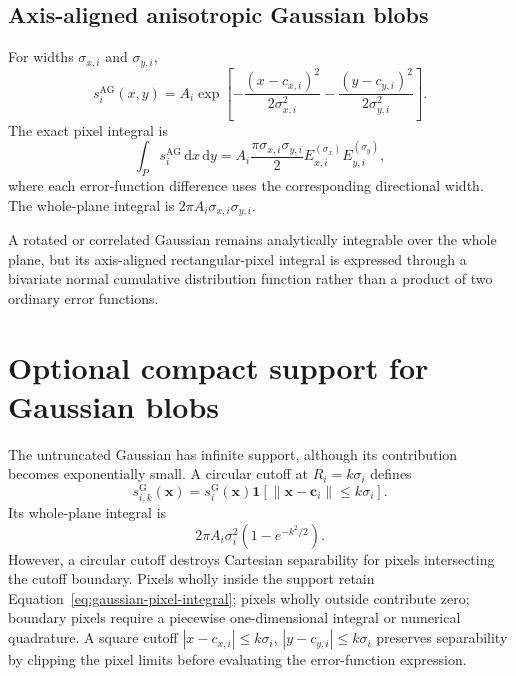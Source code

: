 \documentclass[11pt,a4paper]{article}
\newcommand{\ind}{\mathbf{1}}
\begin{document}
\subsection{Axis-aligned anisotropic Gaussian blobs}

For widths $\sigma_{x,i}$ and $\sigma_{y,i}$,
\begin{equation}
s_i^{\mathrm{AG}}(x,y)
=
A_i\exp\!\left[
-\frac{(x-c_{x,i})^2}{2\sigma_{x,i}^2}
-\frac{(y-c_{y,i})^2}{2\sigma_{y,i}^2}
\right].
\end{equation}
The exact pixel integral is
\begin{equation}
\int_P s_i^{\mathrm{AG}}\,\mathrm{d}x\,\mathrm{d}y
=
A_i\frac{\pi\sigma_{x,i}\sigma_{y,i}}{2}
E_{x,i}^{(\sigma_x)}E_{y,i}^{(\sigma_y)},
\end{equation}
where each error-function difference uses the corresponding directional width.
The whole-plane integral is $2\pi A_i\sigma_{x,i}\sigma_{y,i}$.

A rotated or correlated Gaussian remains analytically integrable over the whole
plane, but its axis-aligned rectangular-pixel integral is expressed through a
bivariate normal cumulative distribution function rather than a product of two
ordinary error functions.

\section{Optional compact support for Gaussian blobs}

The untruncated Gaussian has infinite support, although its contribution becomes
exponentially small. A circular cutoff at $R_i=k\sigma_i$ defines
\begin{equation}
s_{i,k}^{\mathrm{G}}(\bm{x})
=
s_i^{\mathrm{G}}(\bm{x})
\ind\!\left[\|\bm{x}-\bm{c}_i\|\le k\sigma_i\right].
\end{equation}
Its whole-plane integral is
\begin{equation}
2\pi A_i\sigma_i^2\left(1-e^{-k^2/2}\right).
\end{equation}
However, a circular cutoff destroys Cartesian separability for pixels intersecting
the cutoff boundary. Pixels wholly inside the support retain
Equation~\eqref{eq:gaussian-pixel-integral}; pixels wholly outside contribute zero;
boundary pixels require a piecewise one-dimensional integral or numerical
quadrature. A square cutoff
$|x-c_{x,i}|\le k\sigma_i$, $|y-c_{y,i}|\le k\sigma_i$ preserves separability by
clipping the pixel limits before evaluating the error-function expression.
\end{document}
